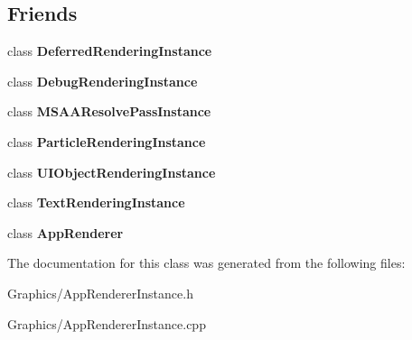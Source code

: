 \subsection*{Friends}
\begin{DoxyCompactItemize}
\item 
\mbox{\label{classAppRendererInstance_a7bec99218ac38952a4baa8888bc7fedc}} 
class {\bfseries Deferred\+Rendering\+Instance}
\item 
\mbox{\label{classAppRendererInstance_aa2fce3a4ae64b69f01e0fd64ba26023a}} 
class {\bfseries Debug\+Rendering\+Instance}
\item 
\mbox{\label{classAppRendererInstance_af2b4490c4b9be86b986502e67885f591}} 
class {\bfseries M\+S\+A\+A\+Resolve\+Pass\+Instance}
\item 
\mbox{\label{classAppRendererInstance_aba9f3240241811e775ef4280a9df4333}} 
class {\bfseries Particle\+Rendering\+Instance}
\item 
\mbox{\label{classAppRendererInstance_af8087aef5ebe8f9a42bfabe1e0672728}} 
class {\bfseries U\+I\+Object\+Rendering\+Instance}
\item 
\mbox{\label{classAppRendererInstance_a5532c3b535b4f2a814054dba701936df}} 
class {\bfseries Text\+Rendering\+Instance}
\item 
\mbox{\label{classAppRendererInstance_a5f3d064e51c4a3bf9409801632b9a7af}} 
class {\bfseries App\+Renderer}
\end{DoxyCompactItemize}


The documentation for this class was generated from the following files\+:\begin{DoxyCompactItemize}
\item 
Graphics/App\+Renderer\+Instance.\+h\item 
Graphics/App\+Renderer\+Instance.\+cpp\end{DoxyCompactItemize}
